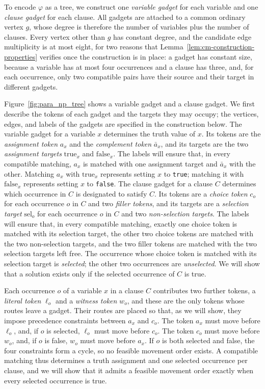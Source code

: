 \documentclass[a4paper,USenglish,thm-restate]{lipics-v2021}
\theoremstyle{problemstyle}
\begin{document}
To encode $\varphi$ as a tree, we construct one \emph{variable gadget} for
each variable and one \emph{clause gadget} for each clause. All gadgets are
attached to a common ordinary vertex $g$, whose degree is therefore the
number of variables plus the number of clauses. Every vertex other than $g$ has
constant degree, and the candidate edge multiplicity is at most eight, for
two reasons that Lemma~\ref{lem:cm-construction-properties} verifies once
the construction is in place: a gadget has constant size, because a
variable has at most four occurrences and a clause has three, and, for each
occurrence, only two compatible pairs have their source and their target in
different gadgets.

Figure~\ref{fig:para_np_tree} shows a variable gadget and a clause gadget.
We first describe the tokens of each gadget and the targets they may
occupy; the vertices, edges, and labels of the gadgets are specified in the
construction below. The variable gadget for a variable $x$ determines the truth value of $x$. Its tokens are the \emph{assignment token}
$a_x$ and the \emph{complement token} $\bar{a}_x$, and its targets are the
two \emph{assignment targets} $\mathrm{true}_x$ and $\mathrm{false}_x$. The
labels will ensure that, in every compatible matching, $a_x$ is matched
with one assignment target and $\bar a_x$ with the other. Matching $a_x$
with $\mathrm{true}_x$ represents setting $x$ to \texttt{true}; matching it
with $\mathrm{false}_x$ represents setting $x$ to \texttt{false}. The clause gadget for a clause $C$ determines which occurrence in $C$ is
designated to satisfy $C$. Its tokens are a \emph{choice token} $c_o$
for each occurrence $o$ in $C$ and two \emph{filler tokens}, and its
targets are a \emph{selection target} $\mathrm{sel}_o$ for each occurrence
$o$ in $C$ and two \emph{non-selection targets}. The labels will ensure
that, in every compatible matching, exactly one choice token is matched
with its selection target, the other two choice tokens are matched with the
two non-selection targets, and the two filler tokens are matched with the
two selection targets left free. The occurrence whose choice token is
matched with its selection target is \emph{selected}; the other two
occurrences are \emph{unselected}. We will show that a solution exists only
if the selected occurrence of $C$ is true.

Each occurrence $o$ of a variable $x$ in a clause $C$ contributes two
further tokens, a \emph{literal token} $\ell_o$ and a \emph{witness token}
$w_o$, and these are the only tokens whose routes leave a gadget. Their routes are placed so that, as we will show, they impose precedence
constraints between $a_x$ and $c_o$. The token $a_x$ must move before
$\ell_o$, and, if $o$ is selected, $\ell_o$ must move before $c_o$. The
token $c_o$ must move before $w_o$, and, if $o$ is false, $w_o$ must move
before $a_x$. If $o$ is both
selected and false, the four constraints form a cycle, so no feasible
movement order exists. A compatible matching thus determines a truth
assignment and one selected occurrence per clause, and we will show that it
admits a feasible movement order exactly when every selected occurrence is
true.
\end{document}
